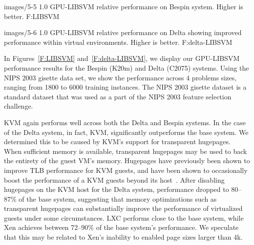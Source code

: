   {images/5-5}
  {1.0}
  {GPU-LIBSVM relative performance on Bespin system.  Higher is better.}
  {F:LIBSVM} 

  {images/5-6}
  {1.0}
  {GPU-LIBSVM relative performance on Delta showing improved performance
within virtual environments.  Higher is better.}
  {F:delta-LIBSVM} 





In Figures~\ref{F:LIBSVM} and~\ref{F:delta-LIBSVM}, we display our GPU-LIBSVM performance results for the
Bespin (K20m) and Delta (C2075) systems. Using the NIPS 2003 gisette data set, we show the
performance across 4 problems sizes, ranging from 1800 to 6000 training
instances. The NIPS 2003 gisette dataset is a standard dataset that was used as a part of
the NIPS 2003 feature selection challenge. 

KVM again performs well across both the Delta and Bespin systems.  In the case
of the Delta system, in fact, KVM, significantly outperforms the base
system.  We determined this to be caused by KVM's support for transparent
hugepages.  When sufficient memory is available, transparent hugepages may be
used to back the entirety of the guest VM's memory.  Hugepages have previously
been shown to improve TLB performance for KVM guests, and have been shown to
occasionally boost the performance of a KVM guests beyond its
host~\cite{Arcangeli:2010}.  After disabling hugepages on the KVM host for the
Delta system, performance dropped to 80--87\% of the base system, suggesting that
memory optimizations such as transparent hugepages can substantially improve the
performance of virtualized guests under some circumstances.  LXC performs close to the base system, while Xen achieves between 72--90\% of the
base system's performance.  We speculate that this may be related to Xen's
inability to enabled page sizes larger than 4k.

